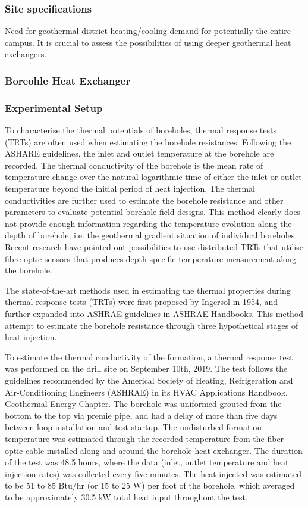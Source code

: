 \subsubsection{Site specifications}
	Need for geothermal district heating/cooling demand for potentially the entire campus. It is crucial to assess the possibilities of using deeper geothermal heat exchangers. 
\subsubsection{Boreohle Heat Exchanger}
	
\subsubsection{Experimental Setup}
	To characterise the thermal potentials of boreholes, thermal response tests (TRTs) are often used when estimating the borehole resistances. Following the ASHARE guidelines, the inlet and outlet temperature at the borehole are recorded. The thermal conductivity of the borehole is the mean rate of temperature change over the natural logarithmic time of either the inlet or outlet temperature beyond the initial period of heat injection. The thermal conductivities are further used to estimate the borehole resistance and other parameters to evaluate potential borehole field designs. This method clearly does not provide enough information regarding the temperature evolution along the depth of borehole, i.e. the geothermal gradient situation of individual boreholes. Recent research have pointed out possibilities to use distributed TRTs that utilise fibre optic sensors that produces depth-specific temperature measurement along the borehole.  
	
	The state-of-the-art methods used in estimating the thermal properties during thermal response tests (TRTs) were first proposed by Ingersol in 1954, and further expanded into ASHRAE guidelines in ASHRAE Handbooks. This method attempt to estimate the borehole resistance through three hypothetical stages of heat injection.  
	
	To estimate the thermal conductivity of the formation, a thermal response test was performed on the drill site on September 10th, 2019. The test follows the guidelines recommended by the Americal Society of Heating, Refrigeration and Air-Conditioning Engineers (ASHRAE) in its HVAC Applications Handbook, Geothermal Energy Chapter. The borehole was uniformed grouted from the bottom to the top via premie pipe, and had a delay of more than five days between loop installation and test startup. The undisturbed formation temperature was estimated through the recorded temperature from the fiber optic cable installed along and around the borehole heat exchanger. The duration of the test was 48.5 hours, where the data (inlet, outlet temperature and heat injection rates) was collected every five minutes.  The heat injected was estimated to be 51 to 85 Btu/hr (or 15 to 25 W) per foot of the borehole, which averaged to be approximately 30.5 kW total heat input throughout the test. 

